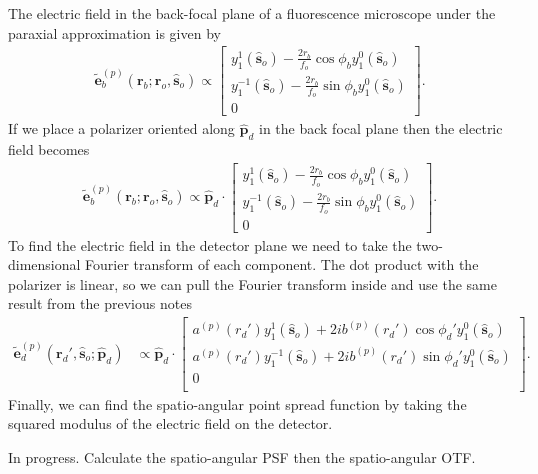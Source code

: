 \documentclass[11pt]{article}
\providecommand{\mb}[1]{\mathbf{#1}}
\providecommand{\ro}[1]{\mathbf{\mathbf{r}}_o}
\providecommand{\so}[1]{\mathbf{\hat{s}}_o}
\providecommand{\rb}[1]{\mathbf{r}_b}
\providecommand{\rd}[1]{\mathbf{r}_d}
\providecommand{\mh}[1]{\mathbf{\hat{#1}}}
\begin{document}
The electric field in the back-focal plane of a fluorescence microscope under
the paraxial approximation is given by
\begin{align}
   \mb{\tilde{e}}^{(p)}_b(\rb{};\ro{}, \so{}) \propto
  \begin{bmatrix}
    y_1^1(\so{}) -\frac{2r_b}{f_o}\cos\phi_by_1^0(\so{})\\
    y_1^{-1}(\so{}) -\frac{2r_b}{f_o}\sin\phi_by_1^0(\so{})\\
    0
  \end{bmatrix}.
\end{align}
If we place a polarizer oriented along $\mh{p}_d$ in the back focal plane then
the electric field becomes
\begin{align}
   \mb{\tilde{e}}^{(p)}_b(\rb{};\ro{}, \so{}) \propto \mh{p}_d \cdot
  \begin{bmatrix}
    y_1^1(\so{}) -\frac{2r_b}{f_o}\cos\phi_by_1^0(\so{})\\
    y_1^{-1}(\so{}) -\frac{2r_b}{f_o}\sin\phi_by_1^0(\so{})\\
    0
  \end{bmatrix}.
\end{align}
To find the electric field in the detector plane we need to take the
two-dimensional Fourier transform of each component. The dot product with the
polarizer is linear, so we can pull the Fourier transform inside and use the same
result from the previous notes
\begin{align}
  \tilde{\mb{e}}^{(p)}_d(\rd{}', \so{}; \mh{p}_d) &\propto \mh{p}_d \cdot
  \begin{bmatrix}
    a^{(p)}(r_d')y_1^{1}(\so{}) + 2ib^{(p)}(r_d')\cos\phi_d'y_1^{0}(\so{})\\
    a^{(p)}(r_d')y_1^{-1}(\so{}) + 2ib^{(p)}(r_d')\sin\phi_d'y_1^{0}(\so{})\\
    0\\
  \end{bmatrix}\label{eq:paracsf}. 
\end{align}
Finally, we can find the spatio-angular point spread function by taking the
squared modulus of the electric field on the detector.

In progress. Calculate the spatio-angular PSF then the spatio-angular OTF. 
\end{document}
